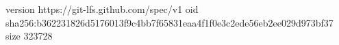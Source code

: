 version https://git-lfs.github.com/spec/v1
oid sha256:b362231826d5176013f9c4bb7f65831eaa4f1f0e3c2ede56eb2ee029d973bf37
size 323728
